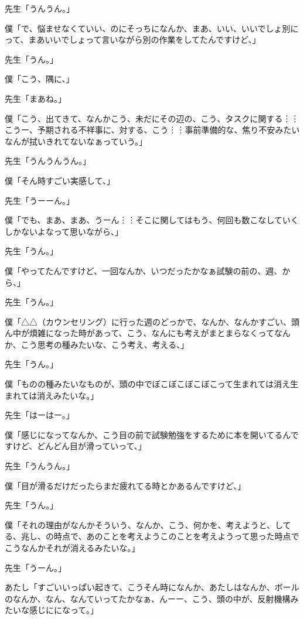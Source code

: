 \documentclass[b5j,twoside,twocolumn]{utarticle}
\begin{document}
\begin{description}
\item 先生「うんうん。」
\item 僕「で、悩ませなくていい、のにそっちになんか、まあ、いい、いいでしょ別にって、まあいいでしょって言いながら別の作業をしてたんですけど、」
\item 先生「うん。」
\item 僕「こう、隅に、」
\item 先生「まあね。」
\item 僕「こう、出てきて、なんかこう、未だにその辺の、こう、タスクに関する︙︙こうー、予期される不祥事に、対する、こう︙︙事前準備的な、焦り不安みたいなんが拭いきれてないなぁっていう。」
\item 先生「うんうんうん。」
\item 僕「そん時すごい実感して、」
\item 先生「うーーん。」
\item 僕「でも、まあ、まあ、うーん︙︙そこに関してはもう、何回も数こなしていくしかないよなって思いながら、」
\item 先生「うん。」
\item 僕「やってたんですけど、一回なんか、いつだったかなぁ試験の前の、週、から、」
\item 先生「うん。」
\item 僕「△△（カウンセリング）に行った週のどっかで、なんか、なんかすごい、頭ん中が煩雑になった時があって、こう、なんにも考えがまとまらなくってなんか、こう思考の種みたいな、こう考え、考える、」
\item 先生「うん。」
\item 僕「ものの種みたいなものが、頭の中でぼこぼこぼこぼこって生まれては消え生まれては消えみたいな。」
\item 先生「はーはー。」
\item 僕「感じになってなんか、こう目の前で試験勉強をするために本を開いてるんですけど、どんどん目が滑っていって、」
\item 先生「うんうん。」
\item 僕「目が滑るだけだったらまだ疲れてる時とかあるんですけど、」
\item 先生「うん。」
\item 僕「それの理由がなんかそういう、なんか、こう、何かを、考えようと、してる、兆し、の時点で、あのことを考えようこのことを考えようって思った時点でこうなんかそれが消えるみたいな。」
\item 先生「うーん。」
\item あたし「すごいいっぱい起きて、こうそん時になんか、あたしはなんか、ボールのなんか、なん、なんていってたかなぁ、んーー、こう、頭の中が、反射機構みたいな感じにになって。」

\end{description}
\end{document}
